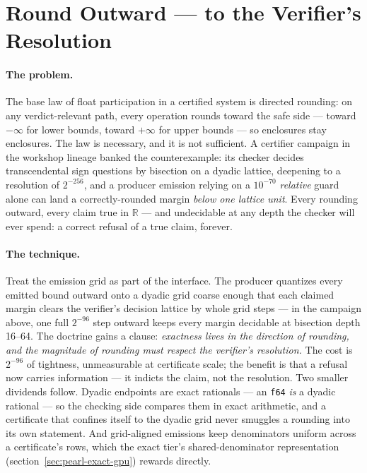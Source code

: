 \section{Round Outward --- to the Verifier's Resolution}
\label{sec:pearl-outward}

\paragraph{The problem.} The base law of float participation in a
certified system is directed rounding: on any verdict-relevant path,
every operation rounds toward the safe side --- toward $-\infty$ for
lower bounds, toward $+\infty$ for upper bounds --- so enclosures stay
enclosures. The law is necessary, and it is not sufficient. A
certifier campaign in the workshop lineage banked the counterexample:
its checker decides transcendental sign questions by bisection on a
dyadic lattice, deepening to a resolution of $2^{-256}$, and a
producer emission relying on a $10^{-70}$ \emph{relative} guard alone
can land a correctly-rounded margin \emph{below one lattice unit}.
Every rounding outward, every claim true in $\mathbb{R}$ --- and
undecidable at any depth the checker will ever spend: a correct
refusal of a true claim, forever.

\paragraph{The technique.} Treat the emission grid as part of the
interface. The producer quantizes every emitted bound outward onto a
dyadic grid coarse enough that each claimed margin clears the
verifier's decision lattice by whole grid steps --- in the campaign
above, one full $2^{-96}$ step outward keeps every margin decidable at
bisection depth 16--64. The doctrine gains a clause: \emph{exactness
lives in the direction of rounding, and the magnitude of rounding must
respect the verifier's resolution.} The cost is $2^{-96}$ of
tightness, unmeasurable at certificate scale; the benefit is that a
refusal now carries information --- it indicts the claim, not the
resolution. Two smaller dividends follow. Dyadic endpoints are
exact rationals --- an \texttt{f64} \emph{is} a dyadic rational --- so
the checking side compares them in exact arithmetic, and a certificate
that confines itself to the dyadic grid never smuggles a rounding into
its own statement. And grid-aligned emissions keep denominators
uniform across a certificate's rows, which the exact tier's
shared-denominator representation
(section~\ref{sec:pearl-exact-gpu}) rewards directly.

